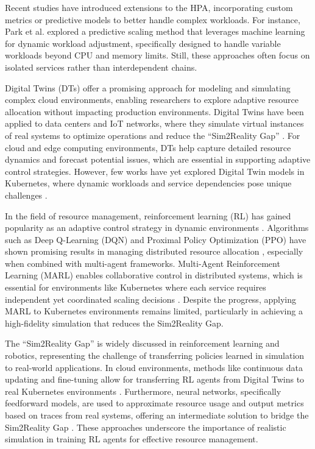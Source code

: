 \documentclass[conference]{IEEEtran}
\begin{document}
Recent studies have introduced extensions to the HPA, incorporating custom metrics or predictive models to better handle complex workloads. For instance, Park et al. \cite{park_predictive_scaling} explored a predictive scaling method that leverages machine learning for dynamic workload adjustment, specifically designed to handle variable workloads beyond CPU and memory limits. Still, these approaches often focus on isolated services rather than interdependent chains.

Digital Twins (DTs) offer a promising approach for modeling and simulating complex cloud environments, enabling researchers to explore adaptive resource allocation without impacting production environments. Digital Twins have been applied to data centers and IoT networks, where they simulate virtual instances of real systems to optimize operations and reduce the ``Sim2Reality Gap'' \cite{schleich_digital_twin}. For cloud and edge computing environments, DTs help capture detailed resource dynamics and forecast potential issues, which are essential in supporting adaptive control strategies. However, few works have yet explored Digital Twin models in Kubernetes, where dynamic workloads and service dependencies pose unique challenges \cite{liu_dt_cloud}.

In the field of resource management, reinforcement learning (RL) has gained popularity as an adaptive control strategy in dynamic environments \cite{li_rl_resource_allocation}. Algorithms such as Deep Q-Learning (DQN) and Proximal Policy Optimization (PPO) have shown promising results in managing distributed resource allocation \cite{schwartz_drl_cloud}, especially when combined with multi-agent frameworks. Multi-Agent Reinforcement Learning (MARL) enables collaborative control in distributed systems, which is essential for environments like Kubernetes where each service requires independent yet coordinated scaling decisions \cite{zhang_marl_k8s}. Despite the progress, applying MARL to Kubernetes environments remains limited, particularly in achieving a high-fidelity simulation that reduces the Sim2Reality Gap.

The ``Sim2Reality Gap'' is widely discussed in reinforcement learning and robotics, representing the challenge of transferring policies learned in simulation to real-world applications. In cloud environments, methods like continuous data updating and fine-tuning allow for transferring RL agents from Digital Twins to real Kubernetes environments \cite{nguyen_sim2reality}. Furthermore, neural networks, specifically feedforward models, are used to approximate resource usage and output metrics based on traces from real systems, offering an intermediate solution to bridge the Sim2Reality Gap \cite{tan_nn_resource_approx}. These approaches underscore the importance of realistic simulation in training RL agents for effective resource management.
\end{document}
